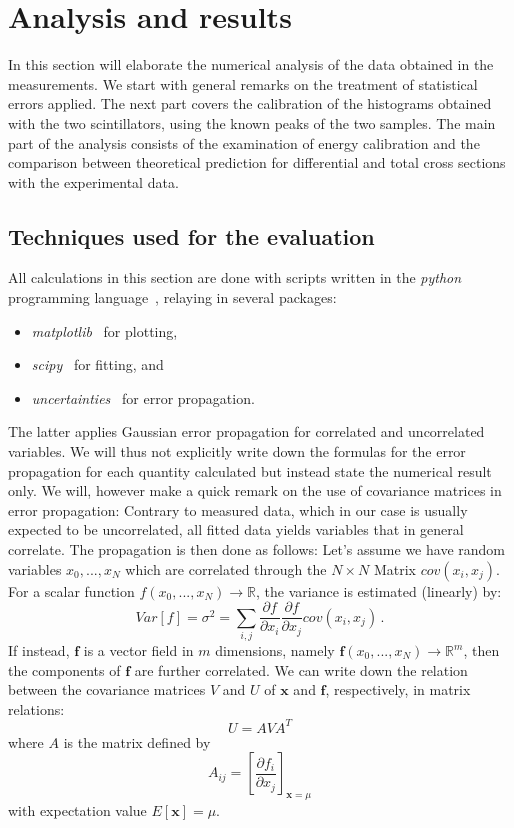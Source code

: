 \clearpage
\section{Analysis and results}
\label{sec:analysis}
In this section will elaborate the numerical analysis of the
data obtained in the measurements. We start with general remarks on the 
treatment of statistical errors applied. The next part covers the calibration 
of the histograms obtained with the two scintillators, using the known 
peaks of the two samples. The main part of the analysis consists of the 
examination of energy calibration and the comparison between theoretical 
prediction for differential and total cross sections with the experimental 
data. 

\subsection{Techniques used for the evaluation}
\label{sub:techique}
All calculations in this section are done with scripts written in 
the \textit{python} programming language~\cite{python}, relaying in several 
packages:
\begin{itemize}
    \item
        \textit{matplotlib}~\cite{Hunter2007} for plotting,
    \item
        \textit{scipy}~\cite{scipy} for fitting, and 
    \item
        \textit{uncertainties}~\cite{uc} for error propagation.
\end{itemize}
The latter applies Gaussian error propagation for correlated and uncorrelated variables. 
We will thus not explicitly write down the formulas for the error propagation 
for each quantity calculated but instead state the numerical result only. 
We will, however make a quick remark on the use of covariance matrices in 
error propagation: Contrary to measured data, which in our case is usually 
expected to be uncorrelated, all fitted data yields variables that in general correlate. 
The propagation is then done as follows:
Let's assume we have random
variables $x_0,...,x_N$ which are correlated through the $N\times N$ Matrix $cov(x_i,x_j)$.
For a scalar function $f(x_0,...,x_N) \rightarrow \mathbb{R}$, the variance is estimated (linearly) by:
\begin{equation}
Var[f] = \sigma^2 = \sum_{i,j} \frac{\partial f}{\partial x_i} \frac{\partial f}{\partial x_j} cov(x_i,x_j) \,.
\end{equation} 
If instead, $\mathbf{f}$ is a vector field in $m$ dimensions, namely 
$\mathbf{f}(x_0,...,x_N) \rightarrow \mathbb{R}^m$, then the components of $\mathbf{f}$ 
are further correlated. We can write down the relation between the covariance matrices $V$ and $U$ of 
$\mathbf{x}$ and $\mathbf{f}$, respectively, in matrix relations:
\begin{equation}
    U = A V A^T
\end{equation}
where $A$ is the matrix defined by 
\begin{equation}
    A_{ij} = \left[ \frac{\partial f_i}{\partial x_j}\right]_{\mathbf{x} = \mu}
\end{equation}
with expectation value $E[\mathbf{x}] = \mu$.~\cite{cowan1998statistical}

